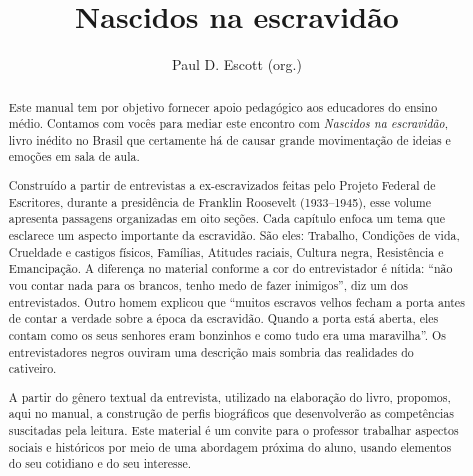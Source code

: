 \documentclass[11pt]{extarticle}
\begin{document}
\newcommand{\AutorLivro}{Paul D. Escott (org.)}
\newcommand{\TituloLivro}{Nascidos na escravidão}
\newcommand{\Tema}{Diálogos com a sociologia e com a antropologia}
\newcommand{\Genero}{Relatos e memórias}
\newcommand{\imagemCapa}{./images/PNLD0007-01.png}
\newcommand{\issnppub}{---}
\newcommand{\issnepub}{---}
\newcommand{\colaborador}{Eduardo Modesto de Carvalho, Bruno Gradella e Vicente Castro}


\title{\TituloLivro}
\author{\AutorLivro}
\def\authornotes{\colaborador}

\date{}
\maketitle

\begin{abstract}

Este manual tem por objetivo fornecer apoio pedagógico aos educadores
do ensino médio. Contamos com vocês para mediar este encontro com \emph{Nascidos na escravidão}, 
livro inédito no Brasil que certamente há de causar grande movimentação de 
ideias e emoções em sala de aula. 

Construído a partir de entrevistas a ex-escravizados feitas pelo Projeto 
Federal de Escritores, durante a presidência de Franklin Roosevelt (1933--1945), 
esse volume apresenta passagens organizadas em oito seções. Cada capítulo 
enfoca um tema que esclarece um aspecto importante da escravidão. São eles: 
Trabalho, Condições de vida, Crueldade e castigos físicos, Famílias, Atitudes 
raciais, Cultura negra, Resistência e Emancipação. A diferença no material 
conforme a cor do entrevistador é nítida: ``não vou contar nada para os 
brancos, tenho medo de fazer inimigos'', diz um dos entrevistados. Outro homem 
explicou que ``muitos escravos velhos fecham a porta antes de contar a verdade 
sobre a época da escravidão. Quando a porta está aberta, eles contam como os 
seus senhores eram bonzinhos e como tudo era uma maravilha''. Os entrevistadores 
negros ouviram uma descrição mais sombria das realidades do cativeiro.

A partir do gênero textual da entrevista, utilizado na elaboração do 
livro, propomos, aqui no manual, a construção de perfis biográficos 
que desenvolverão as competências suscitadas pela leitura. Este 
material é um convite para o professor trabalhar aspectos sociais 
e históricos por meio de uma abordagem próxima do aluno, usando 
elementos do seu cotidiano e do seu interesse.


\end{abstract}
\end{document}
